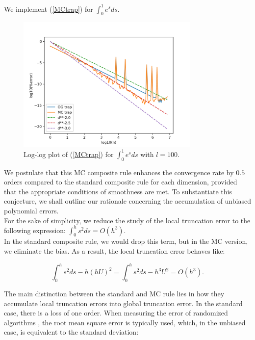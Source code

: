 \documentclass[a4paper,12pt]{article}
\begin{document}
\begin{pythonn}
    We implement (\ref{MCtrap}) for $\int_{0}^{1}e^{s}ds$.
    \vspace*{0.5cm}

    \begin{figure}[h!]
        \centering
        \includegraphics[width=0.8\textwidth]{plots/MCtrap.png}
        \caption{Log-log plot of (\ref{MCtrap}) for
        $\int_{0}^{1}e^{s}ds$ with $l=100$.
        }
        \label{fig:MCtrap}
    \end{figure}
\end{pythonn}

We postulate that this MC composite rule enhances the convergence
rate by $0.5$ orders compared to the standard composite rule for each dimension,
provided that the appropriate conditions of smoothness are met.
To substantiate this conjecture, we shall outline our rationale concerning
the accumulation of unbiased polynomial errors.\\

For the sake of simplicity, we reduce the study of the local truncation error
to the following expression: $\int_{0}^{h} s^{2}ds = O(h^{3})$. \\

In the standard composite rule, we would drop this term, but in
the MC version, we eliminate the bias. As a result,
the local truncation error behaves like:

\[
    \int_{0}^{h} s^{2}ds- h(hU)^{2} = \int_{0}^{h} s^{2}ds- h^{3}U^{2} = O(h^{3})
    .\]

The main distinction between the standard and MC rule lies in how they
accumulate local truncation errors into global truncation error. In the standard
case, there is a loss of one order. When measuring the error of randomized algorithms
, the root mean square error is typically used, which, in the unbiased case,
is equivalent to the standard deviation:
\end{document}

